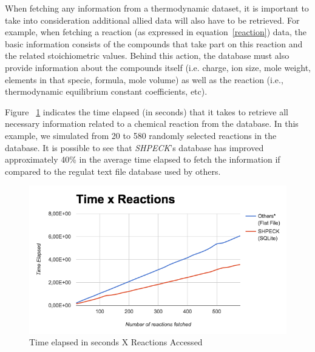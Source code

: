 When fetching any information from a thermodynamic dataset, it is important to take into consideration additional allied data will also have to be retrieved. For example, when fetching a reaction (as expressed in equation~\ref{reaction}) data, the basic information consists of the compounds that take part on this reaction and the related stoichiometric values. Behind this action, the database must also provide information about the compounds itself (i.e. charge, ion size, mole weight, elements in that specie, formula, mole volume) as well as the reaction (i.e., thermodynamic equilibrium constant coefficients, etc).

Figure ~\ref{fig:timeXaccess} indicates the time elapsed (in seconds) that it takes to retrieve all necessary information related to a chemical reaction from the database. In this example, we simulated from 20 to 580 randomly selected reactions in the database. It is possible to see that \emph{SHPECK}'s database has improved approximately 40\% in the average time elapsed to fetch the information if compared to the regulat text file database used by others.

\begin{figure}[ht!]
\centering
\includegraphics[width=140mm]{figures/timeXreactionAccess.png}
\caption{Time elapsed in seconds X Reactions Accessed}
\label{fig:timeXaccess}
\end{figure}



\newpage

